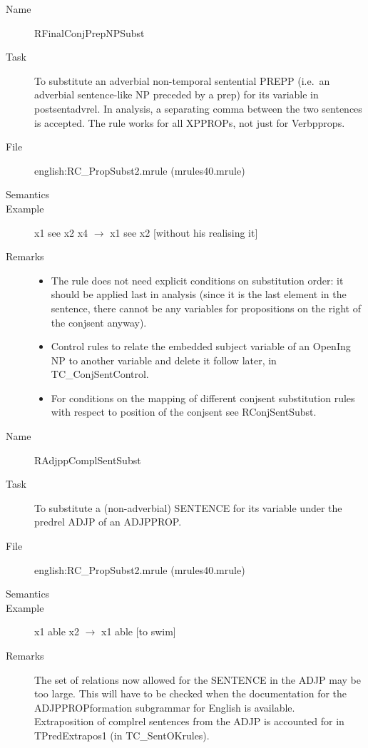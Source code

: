 \begin{description}
\vspace{1 cm}
\begin{description}
\item[Name] RFinalConjPrepNPSubst
\item[Task] To substitute an adverbial non-temporal sentential PREPP 
(i.e.\ an adverbial
sentence-like NP preceded by a prep) for its variable in 
postsentadvrel. In analysis, a separating comma between the two sentences is 
accepted. The rule works for all XPPROPs, not just for Verbpprops.
\item[File] english:RC\_PropSubst2.mrule (mrules40.mrule)
\item[Semantics]
\item[Example] x1 see x2 x4 $\rightarrow$ x1 see x2 [without his realising it]
\item[Remarks] \mbox{}
\begin{itemize}
\item The rule does not need explicit conditions on substitution order: it 
should be applied last in analysis (since it is the last element in the 
sentence, there cannot be any variables for propositions on 
the right of the conjsent anyway). 
\item Control rules to relate the embedded subject variable of an OpenIng NP 
to another variable and delete it follow later, in TC\_ConjSentControl.
\item For conditions on the mapping of different conjsent substitution rules 
with respect to position of the conjsent see RConjSentSubst.
\end{itemize}
\end{description}

\vspace{1 cm}
\begin{description}
\item[Name]   RAdjppComplSentSubst
\item[Task] To substitute a (non-adverbial) SENTENCE for its variable under the 
predrel ADJP of an ADJPPROP.
\item[File] english:RC\_PropSubst2.mrule (mrules40.mrule)
\item[Semantics]
\item[Example] x1 able x2 $\rightarrow$ x1 able [to swim]
\item[Remarks] The set of relations now allowed for the SENTENCE in the ADJP 
may be too large. This will have to be checked when the 
documentation for the ADJPPROPformation subgrammar for English is available.\\
Extraposition of complrel sentences from the ADJP is accounted 
for in TPredExtrapos1 (in TC\_SentOKrules). 
\end{description}


\end{description}
